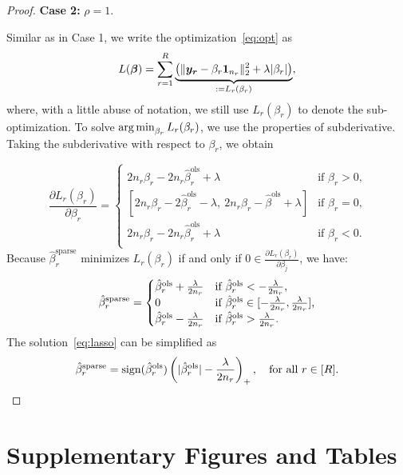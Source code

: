 \documentclass{article}
\newcommand*{\KeepStyleUnderBrace}[1]{%
  \mathop{%
    \mathchoice
    {\underbrace{\displaystyle#1}}%
    {\underbrace{\textstyle#1}}%
    {\underbrace{\scriptstyle#1}}%
    {\underbrace{\scriptscriptstyle#1}}%
  }\limits
}
\begin{document}
\begin{appendices}
\begin{proof}
{\bf Case 2: } $\rho=1$.\par

Similar as in Case 1, we write the optimization~\eqref{eq:opt} as
\[
L({\bm \beta})=\sum_{r=1}^R\KeepStyleUnderBrace{\left(\vnormSize{}{\my_{\mr}-\beta_r\mathbf{1}_{n_r}}^2+\lambda |\beta_{r}|\right)}_{:=L_r(\beta_r)},
\]
where, with a little abuse of notation, we still use $L_r(\beta_r)$ to denote the sub-optimization. To solve $\operatorname*{arg\,min}_{\beta_r}L_r(\beta_r)$, we use the properties of subderivative. Taking the subderivative with respect to $\beta_r$, we obtain
	
\begin{equation}
\frac{\partial L_r(\beta_r)}{\partial \beta_r} = 
\begin{cases}
2n_r\beta_r-2n_r\hat \beta^{\text{ols}}_r+\lambda &\mbox{if $\beta_r>0$,}\\
 [2n_r\beta_r-2\hat \beta^{\text{ols}}_r-\lambda, \ 2n_r\beta_r-\hat \beta^{\text{ols}}+\lambda]&\mbox{if $\beta_r=0$,}\\
2n_r\beta_r-2n_r\hat \beta^{\text{ols}}_r+\lambda &\mbox{if $\beta_r<0$.}\\
\end{cases}
\end{equation}
Because $\hat \beta^{\text{sparse}}_r$ minimizes $L_r(\beta_r)$ if and only if $0 \in \frac{\partial L_r(\beta_r)}{\partial \beta_j}$, we have:
\begin{equation}\label{eq:lasso}
\hat \beta^{\text{sparse}}_r=
\begin{cases}
\hat \beta^{\text{ols}}_r+{\lambda\over 2n_r}&\mbox{if $\hat \beta^{\text{ols}}_r<-{\lambda \over 2n_r}$,}\\
0 &\mbox{if $\hat \beta^{\text{ols}}_r\in[-{\lambda \over 2n_r},{\lambda \over 2n_r}]$,}\\
\hat \beta^{\text{ols}}_r-{\lambda\over 2n_r}&\mbox{if $\hat \beta^{\text{ols}}_r>{\lambda \over 2n_r}$.}\\
\end{cases}
\end{equation}
The solution~\eqref{eq:lasso} can be simplified as 
\[
\hat \beta^{\text{sparse}}_r=\text{sign}(\hat \beta^{\text{ols}}_r)\left(|\hat \beta^{\text{ols}}_r|-{\lambda\over 2n_r}\right)_{+},\quad \text{for all $r\in[R]$}.
\]
\qedhere
\end{proof}

\section{Supplementary Figures and Tables}


\end{appendices}
\end{document}
